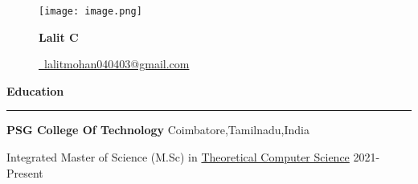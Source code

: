 \documentclass{article}
\begin{document}
\begin{figure}[h]
    \texttt{[image: image.png]}
    \begin{minipage}{.85\linewidth}
        \begin{center}
            \vspace*{-2cm}
            \fontsize{20}{20}
            \textbf{Lalit C}\par %
            \fontsize{12}{14}
            \faEnvelope\href{mailto:lalitmohan040403@gmail.com}{\ lalitmohan040403@gmail.com} %
            
        \end{center}
    \end{minipage}
\end{figure}\par




\hypersetup{hidelinks,colorlinks,urlcolor=black}
\vspace*{0.5cm} %
\fontsize{15}{14}
\faUniversity\textbf{\Large{Education}}\par
\rule{\linewidth}{0.5pt} %
\fontsize{10}{14}
\vspace*{0.25cm}\par\textbf{PSG College Of Technology}  \hfill\fontsize{8}{14}Coimbatore,Tamilnadu,India\par
Integrated Master of Science (M.Sc) in \href{https://s3.us-west-2.amazonaws.com/secure.notion-static.com/78fe11b0-7e18-4553-ad3d-65f6e20e70c9/Syllabus.pdf?X-Amz-Algorithm=AWS4-HMAC-SHA256&X-Amz-Content-Sha256=UNSIGNED-PAYLOAD&X-Amz-Credential=AKIAT73L2G45EIPT3X45\%2F20230204\%2Fus-west-2\%2Fs3\%2Faws4_request&X-Amz-Date=20230204T142759Z&X-Amz-Expires=86400&X-Amz-Signature=68b85a34ba3db514d415df39d9d28a840ae409ea2239c61ee33a7eb012d874a9&X-Amz-SignedHeaders=host&response-content-disposition=filename\%3D\%22Syllabus.pdf\%22&x-id=GetObject}{Theoretical Computer Science} \hfill2021-Present
\end{document}
